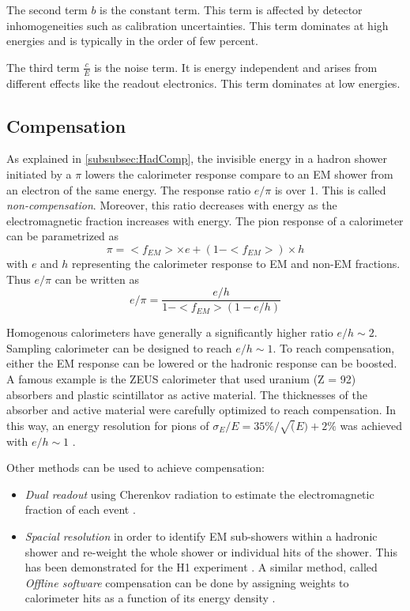 The second term $b$ is the constant term. This term is affected by detector inhomogeneities such as calibration uncertainties. This term dominates at high energies and is typically in the order of few percent.

The third term $\frac{c}{E}$ is the noise term. It is energy independent and arises from different effects like the readout electronics. This term dominates at low energies.

\subsection{Compensation}
\label{subsec:Compensation}

As explained in \ref{subsubsec:HadComp}, the invisible energy in a hadron shower initiated by a $\pi$ lowers the calorimeter response compare to an EM shower from an electron of the same energy. The response ratio $e/\pi$ is over 1. This is called \textit{non-compensation}. Moreover, this ratio decreases with energy as the electromagnetic fraction increases with energy. The pion response of a calorimeter can be parametrized as
\begin{equation}
  \pi = <f_{EM}> \times e + (1 - <f_{EM}>) \times h
\end{equation}
with $e$ and $h$ representing the calorimeter response to EM and non-EM fractions. Thus $e/\pi$ can be written as
\begin{equation}
  e/\pi = \frac{e/h}{1 - <f_{EM}>\left(1 - e/h\right)}
\end{equation}

Homogenous calorimeters have generally a significantly higher ratio $e/h \sim 2$. Sampling calorimeter can be designed to reach $e/h \sim 1$. To reach compensation, either the EM response can be lowered or the hadronic response can be boosted. A famous example is the ZEUS calorimeter that used uranium (Z = 92) absorbers and plastic scintillator as active material. The thicknesses of the absorber and active material were carefully optimized to reach compensation. In this way, an energy resolution for pions of $\sigma_E/E = 35\%/\sqrt(E) + 2\%$ was achieved with $e/h \sim 1$ \cite{BERNSTEIN199323}.

Other methods can be used to achieve compensation:
\begin{itemize}
  \item \textit{Dual readout} using Cherenkov radiation to estimate the electromagnetic fraction of each event \cite{Akchurin:2013yaa}.
  \item \textit{Spacial resolution} in order to identify EM sub-showers within a hadronic shower and re-weight the whole shower or individual hits of the shower. This has been demonstrated for the H1 experiment \cite{Schacht:1990zw}. A similar method, called \textit{Offline software} compensation can be done by assigning weights to calorimeter hits as a function of its energy density \cite{SoftCompNew2012}.
\end{itemize}

